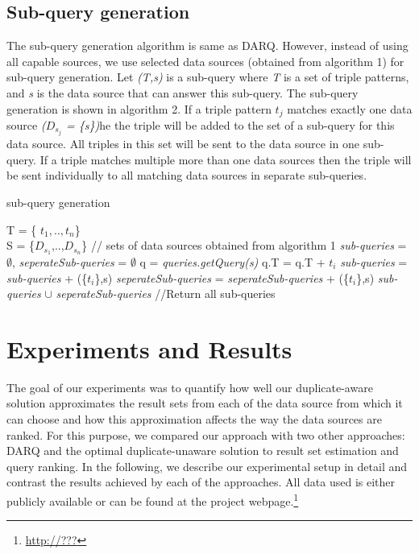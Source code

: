 \documentclass{sig-alternate}  %
\begin{document}
\subsection{Sub-query generation}
 The sub-query generation algorithm is same as DARQ. However, instead of using all capable sources, we use selected data sources (obtained from algorithm 1) for sub-query generation. Let \emph{(T,s)} is a sub-query where \emph{T} is a set of triple patterns, and \emph{s} is the data source that can answer this sub-query. The sub-query generation is shown in algorithm 2. If a triple pattern \emph{$t_j$} matches exactly one data source \emph{($D_{s_j}$ = \{s\})}he the triple will be added to the set of a sub-query for this data source. All triples in this set will be sent to the data
source in one sub-query. If a triple matches multiple more than one data sources then the triple will be sent individually to all matching data sources
in separate sub-queries.
\begin{algorithm}
\caption{sub-query generation}
\begin{algorithmic} [1]
\REQUIRE T = \{ $t_1,..,t_n$\} \\
 S = \{$D_{s_1}$,..,$D_{s_n}$\} // sets of data sources obtained from algorithm 1  
\STATE \emph{sub-queries} = $\emptyset$, \emph{seperateSub-queries} = $\emptyset$
\STATE q = \emph{queries.getQuery(s)}
\STATE q.T = q.T + $t_i$
\ELSE 
\STATE \emph{sub-queries} = \emph{sub-queries} + (\{$t_i$\},s)
\ENDIF
\ELSE 
{}
\STATE \emph{seperateSub-queries} = \emph{seperateSub-queries} + (\{$t_i$\},s)
\ENDFOR
\ENDIF
\ENDFOR
\RETURN \emph{sub-queries} $\cup$ \emph{seperateSub-queries} //Return all sub-queries
\end{algorithmic}
\end{algorithm}
\section{Experiments and Results}
The goal of our experiments was to quantify how well our duplicate-aware solution approximates the result sets from each of the data source from which it can choose and how this approximation affects the way the data sources are ranked.
For this purpose, we compared our approach with two other approaches: DARQ and the optimal duplicate-unaware solution to result set estimation and query ranking. 
In the following, we describe our experimental setup in detail and contrast the results achieved by each of the approaches.
All data used is either publicly available or can be found at the project webpage.\footnote{\url{http://???}}
\end{document}
